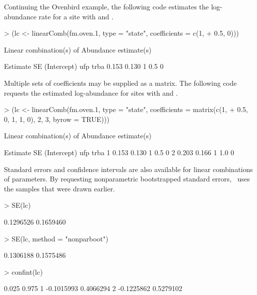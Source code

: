 \documentclass[article,shortnames]{jss}
\newcommand{\um}{\pkg{unmarked}}
\begin{document}
Continuing the Ovenbird example, the following code estimates the
log-abundance rate for a site with  and .

\begin{Schunk}
\begin{Sinput}
> (lc <- linearComb(fm.oven.1, type = "state", coefficients = c(1, 
+     0.5, 0)))
\end{Sinput}
\begin{Soutput}
Linear combination(s) of Abundance estimate(s)

 Estimate    SE (Intercept) ufp trba
    0.153 0.130           1 0.5    0
\end{Soutput}
\end{Schunk}

Multiple sets of coefficients may be supplied as a matrix.  The
following code requests the estimated log-abundance for sites with
 and . 

\begin{Schunk}
\begin{Sinput}
> (lc <- linearComb(fm.oven.1, type = "state", coefficients = matrix(c(1, 
+     0.5, 0, 1, 1, 0), 2, 3, byrow = TRUE)))
\end{Sinput}
\begin{Soutput}
Linear combination(s) of Abundance estimate(s)

  Estimate    SE (Intercept) ufp trba
1    0.153 0.130           1 0.5    0
2    0.203 0.166           1 1.0    0
\end{Soutput}
\end{Schunk}

Standard errors and confidence intervals are also available for linear
combinations of parameters.  By requesting nonparametric bootstrapped
standard errors, \um\ uses the samples that were drawn earlier.

\begin{Schunk}
\begin{Sinput}
> SE(lc)
\end{Sinput}
\begin{Soutput}
[1] 0.1296526 0.1659460
\end{Soutput}
\begin{Sinput}
> SE(lc, method = "nonparboot")
\end{Sinput}
\begin{Soutput}
[1] 0.1306188 0.1575486
\end{Soutput}
\begin{Sinput}
> confint(lc)
\end{Sinput}
\begin{Soutput}
       0.025     0.975
1 -0.1015993 0.4066294
2 -0.1225862 0.5279102
\end{Soutput}
\end{Schunk}
\end{document}

